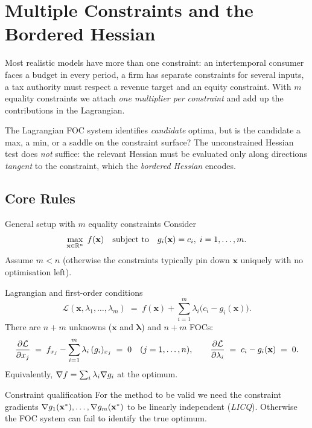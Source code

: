 \chapter{Multiple Constraints and the Bordered Hessian}

Most realistic models have more than one constraint: an intertemporal consumer faces a budget in every
period, a firm has separate constraints for several inputs, a tax authority
must respect a revenue target and an equity constraint. With $m$ equality
constraints we attach \emph{one multiplier per constraint} and add up the
contributions in the Lagrangian.

The Lagrangian FOC system identifies \emph{candidate} optima, but is the
candidate a max, a min, or a saddle on the constraint surface? The
unconstrained Hessian test does \emph{not} suffice: the relevant Hessian
must be evaluated only along directions \emph{tangent} to the constraint,
which the \emph{bordered Hessian}
encodes.

\section{Core Rules}

\begin{rulebox}{General setup with $m$ equality constraints}
Consider
\[
\max_{\mathbf{x} \in \mathbb{R}^n} \; f(\mathbf{x}) \quad \text{subject to} \quad
g_i(\mathbf{x}) = c_i, \; i = 1, \dots, m.
\]
Assume $m < n$ (otherwise the constraints typically pin down $\mathbf{x}$
uniquely with no optimisation left).
\end{rulebox}

\begin{rulebox}{Lagrangian and first-order conditions}
\[
\mathcal{L}(\mathbf{x}, \lambda_1, \dots, \lambda_m) \;=\; f(\mathbf{x})
+ \sum_{i = 1}^m \lambda_i \bigl( c_i - g_i(\mathbf{x}) \bigr).
\]
There are $n + m$ unknowns ($\mathbf{x}$ and $\boldsymbol{\lambda}$) and
$n + m$ FOCs:
\[
\frac{\partial \mathcal{L}}{\partial x_j} \;=\; f_{x_j} - \sum_{i = 1}^m \lambda_i \,
(g_i)_{x_j} \;=\; 0 \quad (j = 1, \dots, n),
\qquad
\frac{\partial \mathcal{L}}{\partial \lambda_i} \;=\; c_i - g_i(\mathbf{x}) \;=\; 0.
\]
Equivalently, $\nabla f = \sum_i \lambda_i \nabla g_i$ at the optimum.
\end{rulebox}

\begin{rulebox}{Constraint qualification}
For the method to be valid we need the constraint gradients
$\nabla g_1(\mathbf{x}^*), \dots, \nabla g_m(\mathbf{x}^*)$ to be linearly
independent (\emph{LICQ}). Otherwise the FOC system can fail to identify
the true optimum.
\end{rulebox}

